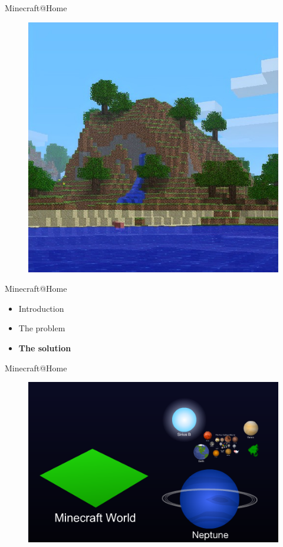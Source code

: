 \documentclass{beamer}
\begin{document}
%
\begin{frame}{Minecraft@Home}
\begin{figure}
  \includegraphics[scale=0.4]{pack2.jpg}
\end{figure}
\end{frame}
%
\begin{frame}{Minecraft@Home}
\begin{itemize}
\item Introduction
\item The problem
\item \textbf{The solution}
\end{itemize}
\end{frame}
%
\begin{frame}{Minecraft@Home}
\begin{figure}
  \includegraphics[width=\linewidth]{mineworld.png}
\end{figure}
\end{frame}
\end{document}
